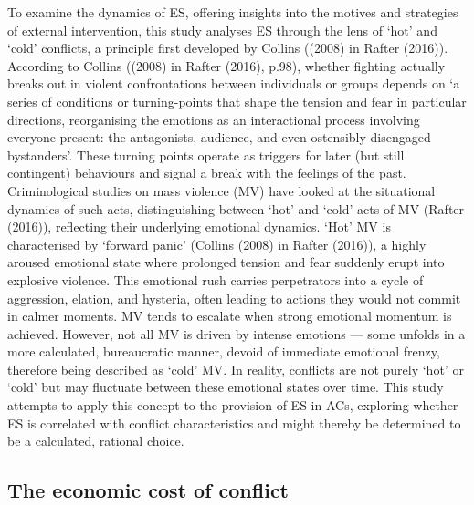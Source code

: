 \documentclass[
]{article}
\begin{document}
To examine the dynamics of ES, offering insights into the motives and
strategies of external intervention, this study analyses ES through the
lens of `hot' and `cold' conflicts, a principle first developed by
Collins ((2008) in Rafter (2016)). According to Collins ((2008) in
Rafter (2016), p.98), whether fighting actually breaks out in violent
confrontations between individuals or groups depends on `a series of
conditions or turning-points that shape the tension and fear in
particular directions, reorganising the emotions as an interactional
process involving everyone present: the antagonists, audience, and even
ostensibly disengaged bystanders'. These turning points operate as
triggers for later (but still contingent) behaviours and signal a break
with the feelings of the past. Criminological studies on mass violence
(MV) have looked at the situational dynamics of such acts,
distinguishing between `hot' and `cold' acts of MV (Rafter (2016)),
reflecting their underlying emotional dynamics. `Hot' MV is
characterised by `forward panic' (Collins (2008) in Rafter (2016)), a
highly aroused emotional state where prolonged tension and fear suddenly
erupt into explosive violence. This emotional rush carries perpetrators
into a cycle of aggression, elation, and hysteria, often leading to
actions they would not commit in calmer moments. MV tends to escalate
when strong emotional momentum is achieved. However, not all MV is
driven by intense emotions --- some unfolds in a more calculated,
bureaucratic manner, devoid of immediate emotional frenzy, therefore
being described as `cold' MV. In reality, conflicts are not purely `hot'
or `cold' but may fluctuate between these emotional states over time.
This study attempts to apply this concept to the provision of ES in ACs,
exploring whether ES is correlated with conflict characteristics and
might thereby be determined to be a calculated, rational choice.

\subsection{The economic cost of
conflict}\label{the-economic-cost-of-conflict}
\end{document}
